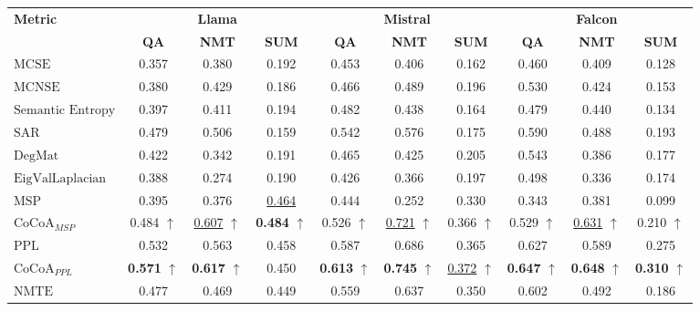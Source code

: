  \begin{table*}[th!]
    \centering
    \renewcommand{\arraystretch}{1.2} %
    \begin{tabular}{lccccccccc}
    \bottomrule
    \multirow{2}{*}{\textbf{Metric}} & \multicolumn{3}{c}{\textbf{Llama}} & \multicolumn{3}{c}{\textbf{Mistral}} & \multicolumn{3}{c}{\textbf{Falcon}} \\  
    \cmidrule(lr){2-4} \cmidrule(lr){5-7} \cmidrule(lr){8-10}
    & \textbf{QA} & \textbf{NMT} & \textbf{SUM} 
    & \textbf{QA} & \textbf{NMT} & \textbf{SUM}  
    & \textbf{QA} & \textbf{NMT} & \textbf{SUM}  \\
    \midrule
    $\text{MCSE}$ & 0.357 & 0.380 & 0.192 & 0.453 & 0.406 & 0.162 & 0.460 & 0.409 & 0.128 \\
$\text{MCNSE}$ & 0.380 & 0.429 & 0.186 & 0.466 & 0.489 & 0.196 & 0.530 & 0.424 & 0.153 \\
$\text{Semantic Entropy}$ & 0.397 & 0.411 & 0.194 & 0.482 & 0.438 & 0.164 & 0.479 & 0.440 & 0.134 \\
$\text{SAR}$ & 0.479 & 0.506 & 0.159 & 0.542 & 0.576 & 0.175 & 0.590 & 0.488 & 0.193 \\
$\text{DegMat}$ & 0.422 & 0.342 & 0.191 & 0.465 & 0.425 & 0.205 & 0.543 & 0.386 & 0.177 \\
$\text{EigValLaplacian}$ & 0.388 & 0.274 & 0.190 & 0.426 & 0.366 & 0.197 & 0.498 & 0.336 & 0.174 \\
    \midrule
$\text{MSP}$ & 0.395 & 0.376 & \underline{0.464} & 0.444 & 0.252 & 0.330 & 0.343 & 0.381 & 0.099 \\
$\text{CoCoA}_{MSP} $  & 0.484  \(\uparrow\)   & \underline{0.607}  \(\uparrow\)   & \textbf{0.484}  \(\uparrow\)   & 0.526  \(\uparrow\)   & \underline{0.721}  \(\uparrow\)   & 0.366  \(\uparrow\)   & 0.529  \(\uparrow\)   & \underline{0.631}  \(\uparrow\)   & 0.210  \(\uparrow\)   \\
    \midrule
$\text{PPL}$ & 0.532 & 0.563 & 0.458 & 0.587 & 0.686 & 0.365 & 0.627 & 0.589 & 0.275 \\
$\text{CoCoA}_{PPL} $ & \textbf{0.571}  \(\uparrow\)   & \textbf{0.617}  \(\uparrow\)   & 0.450   & \textbf{0.613}  \(\uparrow\)   & \textbf{0.745}  \(\uparrow\)   & \underline{0.372}  \(\uparrow\)   & \textbf{0.647}  \(\uparrow\)   & \textbf{0.648}  \(\uparrow\)   & \textbf{0.310}  \(\uparrow\)   \\
    \midrule
$\text{NMTE}$ & 0.477 & 0.469 & 0.449 & 0.559 & 0.637 & 0.350 & 0.602 & 0.492 & 0.186 \\

\end{tabular}
\end{table*}
